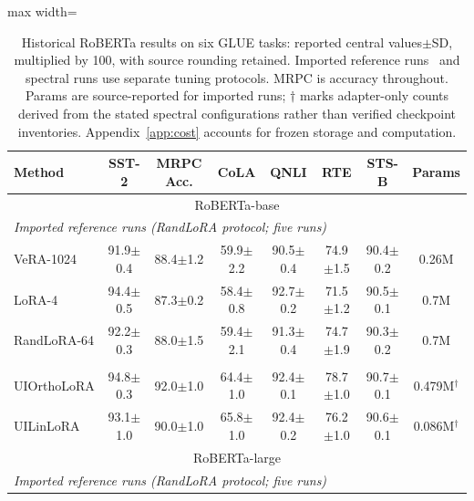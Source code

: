 \documentclass{article}
\begin{document}
\begin{table}[t]
\centering
\caption{Historical RoBERTa results on six GLUE tasks: reported central values$\pm$SD, multiplied by 100, with source rounding retained. Imported reference runs~\citep{albert2025randlora} and spectral runs use separate tuning protocols. MRPC is accuracy throughout. Params are source-reported for imported runs; $\dagger$ marks adapter-only counts derived from the stated spectral configurations rather than verified checkpoint inventories. Appendix~\ref{app:cost} accounts for frozen storage and computation.}
\label{tab:glue_results_base_large}
\begin{adjustbox}{max width=\linewidth}
\begin{tabular}{@{}lccccccc@{}}
\toprule
Method & SST-2 & MRPC Acc. & CoLA & QNLI & RTE & STS-B & Params \\
\midrule
\multicolumn{8}{c}{RoBERTa-base} \\
\midrule
\multicolumn{8}{l}{\textit{Imported reference runs (RandLoRA protocol; five runs)}} \\
VeRA-1024 & 91.9{\scriptsize$\pm$0.4} & 88.4{\scriptsize$\pm$1.2} & 59.9{\scriptsize$\pm$2.2} & 90.5{\scriptsize$\pm$0.4} & 74.9{\scriptsize$\pm$1.5} & 90.4{\scriptsize$\pm$0.2} & 0.26M \\
LoRA-4 & 94.4{\scriptsize$\pm$0.5} & 87.3{\scriptsize$\pm$0.2} & 58.4{\scriptsize$\pm$0.8} & 92.7{\scriptsize$\pm$0.2} & 71.5{\scriptsize$\pm$1.2} & 90.5{\scriptsize$\pm$0.1} & 0.7M \\
RandLoRA-64 & 92.2{\scriptsize$\pm$0.3} & 88.0{\scriptsize$\pm$1.5} & 59.4{\scriptsize$\pm$2.1} & 91.3{\scriptsize$\pm$0.4} & 74.7{\scriptsize$\pm$1.9} & 90.3{\scriptsize$\pm$0.2} & 0.7M \\
\addlinespace
\multicolumn{8}{l}{\textit{Spectral instruments (reported protocol; six seeds)}} \\
UIOrthoLoRA & 94.8{\scriptsize$\pm$0.3} & 92.0{\scriptsize$\pm$1.0} & 64.4{\scriptsize$\pm$1.0} & 92.4{\scriptsize$\pm$0.1} & 78.7{\scriptsize$\pm$1.0} & 90.7{\scriptsize$\pm$0.1} & 0.479M$^{\dagger}$ \\
UILinLoRA & 93.1{\scriptsize$\pm$1.0} & 90.0{\scriptsize$\pm$1.0} & 65.8{\scriptsize$\pm$1.0} & 92.4{\scriptsize$\pm$0.2} & 76.2{\scriptsize$\pm$1.0} & 90.6{\scriptsize$\pm$0.1} & 0.086M$^{\dagger}$ \\
\midrule
\multicolumn{8}{c}{RoBERTa-large} \\
\midrule
\multicolumn{8}{l}{\textit{Imported reference runs (RandLoRA protocol; five runs)}} \\

\end{tabular}
\end{adjustbox}
\end{table}
\end{document}

